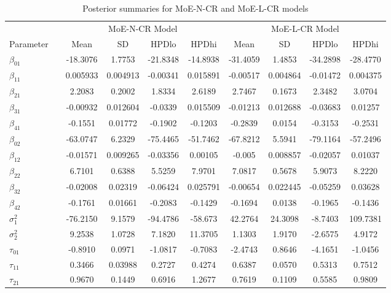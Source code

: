 \documentclass[10.5pt]{article} %
\begin{document}
\begin{table}[H]
\centering
\caption{Posterior summaries for MoE-N-CR and MoE-L-CR models}
\begin{tabular}{llcccccccc}
\toprule
& & \multicolumn{4}{c}{MoE-N-CR Model} & \multicolumn{4}{c}{MoE-L-CR Model} \\
Parameter & & Mean & SD & HPDlo & HPDhi & Mean & SD & HPDlo & HPDhi \\
\midrule
$\beta_{01}$ && -18.3076 & 1.7753 & -21.8348 & -14.8938 & -31.4059 & 1.4853 & -34.2898 & -28.4770 \\
$\beta_{11}$ && 0.005933 & 0.004913 & -0.00341 & 0.015891 & -0.00517 & 0.004864 & -0.01472 & 0.004375 \\
$\beta_{21}$ && 2.2083 & 0.2002 & 1.8334 & 2.6189 & 2.7467 & 0.1673 & 2.3482 & 3.0704 \\
$\beta_{31}$ && -0.00932 & 0.012604 & -0.0339 & 0.015509 & -0.01213 & 0.012688 & -0.03683 & 0.01257 \\
$\beta_{41}$ && -0.1551 & 0.01772 & -0.1902 & -0.1203 & -0.2839 & 0.0154 & -0.3153 & -0.2531 \\
$\beta_{02}$ && -63.0747 & 6.2329 & -75.4465 & -51.7462 & -67.8212 & 5.5941 & -79.1164 & -57.2496 \\
$\beta_{12}$ && -0.01571 & 0.009265 & -0.03356 & 0.00105 & -0.005 & 0.008857 & -0.02057 & 0.01037 \\
$\beta_{22}$ && 6.7101 & 0.6388 & 5.5259 & 7.9701 & 7.0817 & 0.5678 & 5.9073 & 8.2220 \\
$\beta_{32}$ && -0.02008 & 0.02319 & -0.06424 & 0.025791 & -0.00654 & 0.022445 & -0.05259 & 0.03628 \\
$\beta_{42}$ && -0.1761 & 0.01661 & -0.2083 & -0.1429 & -0.1694 & 0.0138 & -0.1965 & -0.1436 \\
$\sigma^2_1$ && -76.2150 & 9.1579 & -94.4786 & -58.673 & 42.2764 & 24.3098 & -8.7403 & 109.7381 \\
$\sigma^2_2$ && 9.2538 & 1.0728 & 7.1820 & 11.3705 & 1.1303 & 1.9170 & -2.6575 & 4.9172 \\
$\tau_{01}$ && -0.8910 & 0.0971 & -1.0817 & -0.7083 & -2.4743 & 0.8646 & -4.1651 & -1.0456 \\
$\tau_{11}$ && 0.3466 & 0.03988 & 0.2727 & 0.4274 & 0.6387 & 0.0570 & 0.5313 & 0.7512 \\
$\tau_{21}$ && 0.9670 & 0.1449 & 0.6916 & 1.2677 & 0.7619 & 0.1109 & 0.5585 & 0.9809 \\
\bottomrule
\end{tabular}
\end{table}
\end{document}
